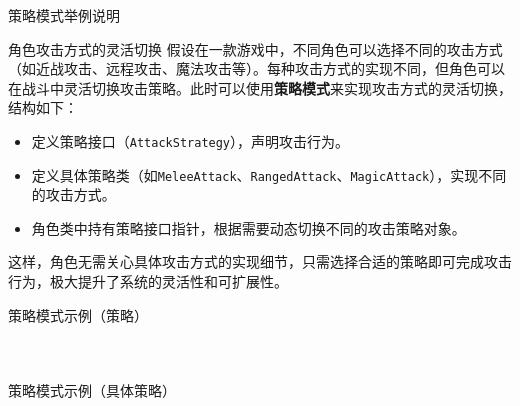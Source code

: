 \documentclass[UTF8,aspectratio=169]{beamer}
\begin{document}
\begin{frame}{策略模式举例说明}
    \begin{exampleytublock}{角色攻击方式的灵活切换}
        假设在一款游戏中，不同角色可以选择不同的攻击方式（如近战攻击、远程攻击、魔法攻击等）。每种攻击方式的实现不同，但角色可以在战斗中灵活切换攻击策略。此时可以使用\textbf{策略模式}来实现攻击方式的灵活切换，结构如下：
        \begin{itemize}
            \item 定义策略接口（\texttt{AttackStrategy}），声明攻击行为。
            \item 定义具体策略类（如\texttt{MeleeAttack}、\texttt{RangedAttack}、\texttt{MagicAttack}），实现不同的攻击方式。
            \item 角色类中持有策略接口指针，根据需要动态切换不同的攻击策略对象。
        \end{itemize}
        这样，角色无需关心具体攻击方式的实现细节，只需选择合适的策略即可完成攻击行为，极大提升了系统的灵活性和可扩展性。
    \end{exampleytublock}
\end{frame}

\begin{frame}{策略模式示例（策略）}
    \begin{columns}
        \begin{column}{0.48\textwidth}
            \inputminted[firstline=1, lastline=13]{cpp}{code/strategy_pattern.cpp}
        \end{column}
        \begin{column}{0.48\textwidth}
            \inputminted[firstline=15, lastline=24]{cpp}{code/strategy_pattern.cpp}
        \end{column}
    \end{columns}
\end{frame}

\begin{frame}{策略模式示例（具体策略）}
    \begin{columns}
        \begin{column}{0.48\textwidth}
            \inputminted[firstline=26, lastline=46]{cpp}{code/strategy_pattern.cpp}
        \end{column}
        \begin{column}{0.48\textwidth}
            \inputminted[firstline=48, lastline=68]{cpp}{code/strategy_pattern.cpp}
        \end{column}
    \end{columns}
\end{frame}
\end{document}
